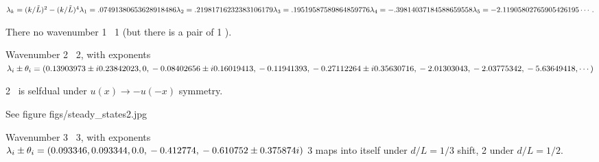 $
\lambda_k = (k/\tilde{L})^2- (k/\tilde{L})^4
\\
\lambda_1 = .07491380653628918486
\\
\lambda_2 = .21981716232383106179
\\
\lambda_3 = .19519587589864859776
\\
\lambda_4 = -.39814037184588659558
\\
\lambda_5 = -2.11905802765905426195
\\
\cdots
\,.
$

There no wavenumber 1 \eqv\ {\nameit}1 (but there is a pair
of {\nameit}1 \reqva).

Wavenumber 2 \eqv\ {\nameit}2, with exponents 
\\
$\lambda_i \pm \theta_i
=(
\\
  0.13903973 \pm i 0.23842023,
\\
  0,
\\
 -0.08402656 \pm i 0.16019413,
\\
 -0.11941393, 
\\
 -0.27112264 \pm i 0.35630716,
\\
 -2.01303043,
\\
 -2.03775342,
\\
 -5.63649418,
\cdots
)$
% 
%

{\nameit}2 \eqv\ is selfdual under $u(x) \to -u(-x)$ symmetry.

See figure figs/steady\_states2.jpg

Wavenumber 3 \eqv\ {\nameit}3, with exponents 
\\
$\lambda_i \pm \theta_i=
(
  0.093346                    , \\
  0.093344                    , \\
  0.0                    , \\
 -0.412774                    , \\
 -0.610752 \pm 0.375874 i
\\
)$
{\nameit}3 maps into itself under $d/L = 1/3$
shift, {\nameit}2 under $d/L = 1/2$.


